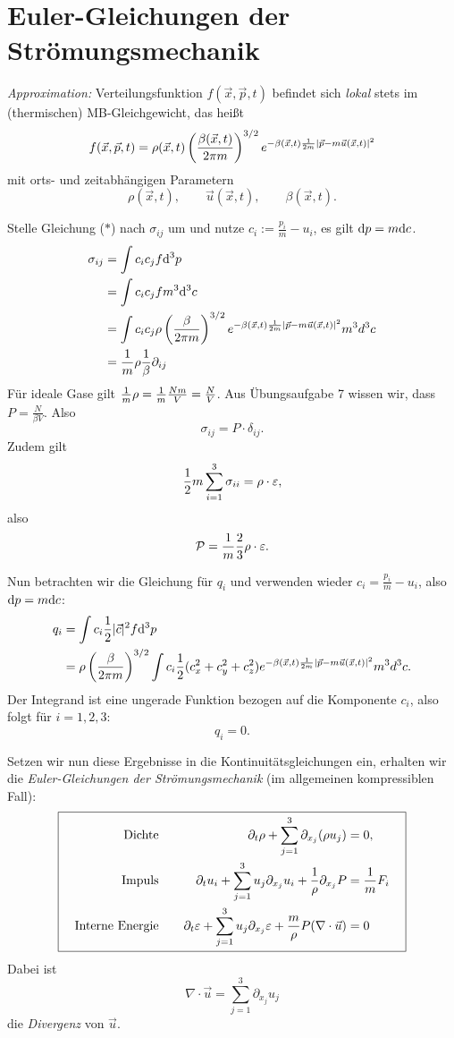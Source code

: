 \section{Euler-Gleichungen der Strömungsmechanik}
\emph{Approximation:} Verteilungsfunktion $f(\vec{x},\vec{p},t)$ befindet sich
\emph{lokal} stets im (thermischen) MB-Gleichgewicht, das heißt
\[ f(\vec{x}, \vec{p}, t) = \rho(\vec{x},t)
  \left( \frac{\beta(\vec{x},t)}{2\pi m}\right)^{3/2} e^{-\beta(\vec{x},t)
    \frac{1}{2m} |\vec{p} - m \vec{u}(\vec{x},t)|^2} \]
mit orts- und zeitabhängigen Parametern
\[ \rho(\vec{x}, t), \qquad \vec{u}(\vec{x}, t), \qquad \beta(\vec{x}, t). \]

Stelle Gleichung ($\ast$) nach $\sigma_{ij}$ um und nutze $c_i := \frac{p_i}{m}
- u_i$, es gilt $\mathrm{d} p = m \mathrm{d} c$.
\begin{align*}
  \sigma_{ij}
  &= \int c_i c_j f \mathrm{d}^3 p \\
  &= \int c_i c_j f m^3 \mathrm{d}^3 c \\
  &= \int c_i c_j \rho \left( \frac{\beta}{2\pi m}\right)^{3/2}
    e^{-\beta(\vec{x},t) \frac{1}{2m} |\vec{p} - m \vec{u}(\vec{x},t)|^2}
    m^3 d^3 c \\
  &= \frac{1}{m} \rho \frac{1}{\beta} \partial_{ij}
\end{align*}
Für ideale Gase gilt  $\frac{1}{m} \rho = \frac{1}{m} \frac{Nm}{V} = \frac{N}{V}$. Aus Übungsaufgabe 7 wissen wir, dass $P = \frac{N}{\beta V}$. Also
\[ \sigma_{ij} =  P \cdot \delta_{ij}. \]
Zudem gilt
\[ \frac{1}{2} m \sum_{i=1}^3 \sigma_{ii} = \rho \cdot \varepsilon, \]
also
\[ \mathcal{P} = \frac{1}{m} \frac{2}{3} \rho \cdot \varepsilon. \]

Nun betrachten wir die Gleichung für $q_i$ und verwenden wieder $c_i = \frac{p_i}{m} - u_i$, also $\mathrm{d} p = m \mathrm{d} c$:
\begin{align*}
  q_i
  &= \int c_i \frac{1}{2} |\vec{c}|^2 f \mathrm{d}^3 p \\
  &= \rho \left( \frac{\beta}{2\pi m}\right)^{3/2}
    \int c_i \frac{1}{2} (c_x^2 + c_y^2 + c_z^2)
    e^{-\beta(\vec{x},t) \frac{1}{2m} |\vec{p} - m \vec{u}(\vec{x},t)|^2}
    m^3 d^3 c.
\end{align*}
Der Integrand ist eine ungerade Funktion bezogen auf die Komponente $c_i$, also
folgt für $i = 1,2,3$:
\[ q_i = 0. \]

Setzen wir nun diese Ergebnisse in die Kontinuitätsgleichungen ein, erhalten
wir die \emph{Euler-Gleichungen der Strömungsmechanik} (im allgemeinen
kompressiblen Fall):
\[
  \boxed{ \quad
    \begin{aligned}
      \text{Dichte}& &
      \partial_ t \rho + \sum_{j=1}^3 \partial_{x_j} (\rho u_j) &= 0, \\
      \text{Impuls}& &
      \partial_t u_i + \sum_{j=1}^3 u_j \partial_{x_j} u_i + \frac{1}{\rho}
      \partial_{x_j} P
      &= \frac{1}{m} F_i \\
      \text{Interne Energie}& \quad & 
      \partial_t \varepsilon + \sum_{j=1}^3 u_j \partial_{x_j} \varepsilon +
      \frac{m}{\rho} P(\nabla \cdot \vec{u}) &= 0
    \end{aligned}
  \quad }
\]
Dabei ist
\[ \nabla \cdot \vec{u} = \sum_{j=1}^3 \partial_{x_j} u_j \]
die \emph{Divergenz} von $\vec{u}$.

